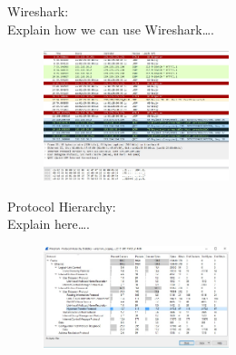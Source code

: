 \documentclass{article}
\begin{document}
Wireshark:\\
Explain how we can use Wireshark….

\begin{figure}[H]
	\begin{center}
		\includegraphics[width=0.48\textwidth]{wireshark.jpg}
	\end{center}
	\caption{ }
	\label{fig:Prd}
\end{figure}

Protocol Hierarchy:\\
Explain here….


\begin{figure}[H]
	\begin{center}
		\includegraphics[width=0.48\textwidth]{Hierarchyst.jpg}
	\end{center}
	\caption{\small  \newline}
	\label{fig:Prd}
\end{figure}



\end{document}
